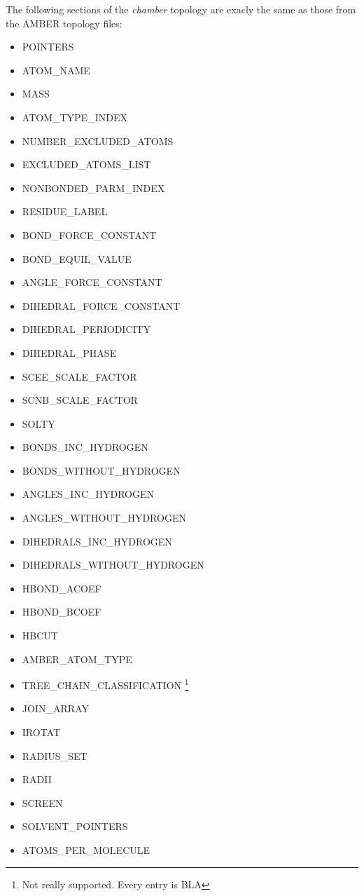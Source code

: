 The following sections of the \emph{chamber} topology are exacly the same as
those from the AMBER topology files:
\begin{itemize}
   \item POINTERS
   \item ATOM\_NAME
   \item MASS
   \item ATOM\_TYPE\_INDEX
   \item NUMBER\_EXCLUDED\_ATOMS
   \item EXCLUDED\_ATOMS\_LIST
   \item NONBONDED\_PARM\_INDEX
   \item RESIDUE\_LABEL
   \item BOND\_FORCE\_CONSTANT
   \item BOND\_EQUIL\_VALUE
   \item ANGLE\_FORCE\_CONSTANT
   \item DIHEDRAL\_FORCE\_CONSTANT
   \item DIHEDRAL\_PERIODICITY
   \item DIHEDRAL\_PHASE
   \item SCEE\_SCALE\_FACTOR
   \item SCNB\_SCALE\_FACTOR
   \item SOLTY
   \item BONDS\_INC\_HYDROGEN
   \item BONDS\_WITHOUT\_HYDROGEN
   \item ANGLES\_INC\_HYDROGEN
   \item ANGLES\_WITHOUT\_HYDROGEN
   \item DIHEDRALS\_INC\_HYDROGEN
   \item DIHEDRALS\_WITHOUT\_HYDROGEN
   \item HBOND\_ACOEF
   \item HBOND\_BCOEF
   \item HBCUT
   \item AMBER\_ATOM\_TYPE
   \item TREE\_CHAIN\_CLASSIFICATION \footnote{Not really supported. Every entry
         is BLA}
   \item JOIN\_ARRAY
   \item IROTAT
   \item RADIUS\_SET
   \item RADII
   \item SCREEN
   \item SOLVENT\_POINTERS
   \item ATOMS\_PER\_MOLECULE
\end{itemize}

